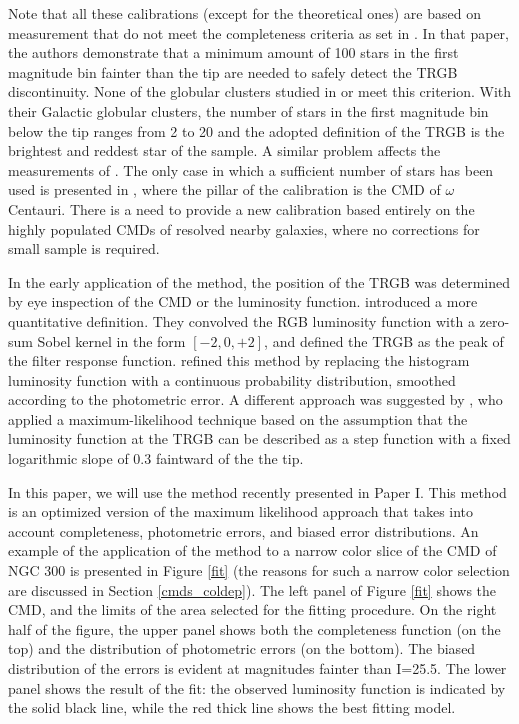 \documentclass[11pt,preprint2]{aastex}
\begin{document}
Note that all these calibrations (except for the theoretical ones) are based on measurement that do not meet the completeness criteria as set in  \citet{1995AJ....109.1645M}. In that paper, the authors demonstrate that a minimum amount of 100 stars in the first magnitude bin fainter than the tip are needed to safely detect the TRGB discontinuity. None of the globular clusters studied in \citet{1990AJ....100..162D} or \citet{1993ApJ...417..553L} meet this criterion. With their Galactic globular clusters, the number of stars in the first magnitude bin below the tip ranges from 2 to 20 and the adopted definition of the TRGB is the brightest and reddest star of the sample. A similar problem affects the measurements of \citet{1999AJ....118.1738F, 2000AJ....119.1282F}. The only case in which a sufficient number of stars has been used is presented in \citet{2001ApJ...556..635B}, where the pillar of the calibration is the CMD of $\omega$ Centauri. There is a need to provide a new calibration based entirely on the highly populated CMDs of resolved nearby galaxies, where no corrections for small sample is required.

In the early application of the method, the position of the TRGB was determined by eye inspection of the CMD or the luminosity function. \citet{1993ApJ...417..553L} introduced a more quantitative definition. They convolved the RGB luminosity function with a zero-sum Sobel kernel in the form $[-2,0,+2]$, and defined the TRGB as the peak of the filter response function. \citet{1996ApJ...461..713S} refined this method by replacing the histogram luminosity function with a continuous probability distribution, smoothed according to the photometric error. A different approach was suggested by \cite{2002AJ....124..213M}, who applied a maximum-likelihood technique based on  the assumption that the luminosity function at the TRGB can be described as a step function with a fixed logarithmic slope of 0.3 faintward of the the tip.

In this paper, we will use the method recently presented in Paper I. This method is an optimized version of the maximum likelihood approach that takes into account completeness, photometric errors, and biased error distributions. An example of the application of the method to a narrow color slice of the CMD of NGC 300 is presented in Figure \ref{fit} (the reasons for such a narrow color selection are discussed in Section \ref{cmds_coldep}). The left panel of Figure \ref{fit} shows the CMD, and the limits of the area selected for the fitting procedure. On the right half of the figure, the upper panel shows both the completeness function (on the top) and the distribution of photometric errors (on the bottom). The biased distribution of the errors is evident at magnitudes fainter than I=25.5. The lower panel shows the result of the fit: the observed luminosity function is indicated by the solid black line, while the red thick line shows the best fitting model. 
\end{document}
